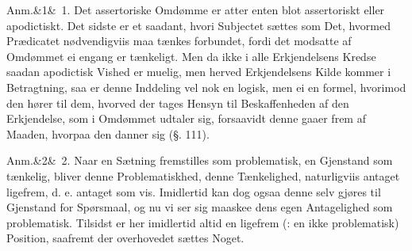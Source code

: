 \documentclass[12pt]{book}
\def\sperr#1{#1}%
\def\textit#1{#1}%
\def\emph#1{#1}%
\newcommand{\sperr}[1]{\textls[180]{#1}}
\newcommand{\anm}[1]{%
  \par\vspace{0.5\baselineskip}%
  \noindent\hspace{\parindent}\sperr{Anm.}\ifx&#1&\else~\textit{#1}.\fi
  \enspace\ignorespaces
}
\newcommand{\opage}[1]{\marginnote{\footnotesize\textit{[#1]}}}
\begin{document}
\anm{1} Det assertoriske Omdømme er atter enten blot \emph{assertoriskt} eller
\emph{apodictiskt}. Det sidste er et saadant, hvori Subjectet sættes som Det, hvormed
Prædicatet nødvendigviis maa tænkes forbundet, fordi det modsatte af Omdømmet ei engang er
tænkeligt. Men da ikke i alle Erkjendelsens Kredse saadan apodictisk Vished er muelig, men
herved Erkjendelsens Kilde kommer i Betragtning, saa er denne Inddeling vel nok en logisk,
men ei en formel, hvorimod den hører til dem, hvorved der tages Hensyn til Beskaffenheden
af den Erkjendelse, som i Omdømmet udtaler sig, forsaavidt denne gaaer frem af Maaden,
hvorpaa den danner sig (§. 111).

\anm{2} Naar en Sætning fremstilles som \emph{problematisk}, en Gjenstand som
\emph{tænkelig}, bliver denne \emph{Problematiskhed}, denne \emph{Tænkelighed},
naturligviis antaget ligefrem, d. e. antaget som vis. Imidlertid kan dog ogsaa denne selv
gjøres til Gjenstand for Spørsmaal, og nu vi%
\opage{284}ser sig maaskee dens egen Antagelighed som \emph{problematisk}. Tilsidst er her imidlertid
altid en ligefrem (: en ikke \emph{problematisk}) Position, saafremt der
overhovedet sættes Noget.
\end{document}
